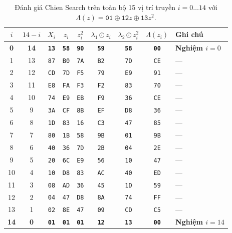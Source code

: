 \begin{table}[!htb]
\centering
\caption{Đánh giá Chien Search trên toàn bộ 15 vị trí truyền $i = 0 \dots 14$ với $\Lambda(z) = \texttt{01} \oplus \texttt{12}z \oplus \texttt{13}z^2$.}
\label{tab:worked_chien}
\scriptsize
\renewcommand{\arraystretch}{1.05}
\begin{tabular}{@{} c c c c c c c c l @{}}
\toprule
$i$ & $14-i$ & $X_i$ & $z_i$ & $z_i^2$ & $\lambda_1 \odot z_i$ & $\lambda_2 \odot z_i^2$ & $\Lambda(z_i)$ & Ghi chú \\
\midrule
\textbf{0} & \textbf{14} & \textbf{\texttt{13}} & \textbf{\texttt{58}} & \textbf{\texttt{90}} & \textbf{\texttt{59}} & \textbf{\texttt{58}} & \textbf{\texttt{00}} & \textbf{Nghiệm $i=0$} \\
1 & 13 & \texttt{87} & \texttt{B0} & \texttt{7A} & \texttt{B2} & \texttt{7D} & \texttt{CE} & --- \\
2 & 12 & \texttt{CD} & \texttt{7D} & \texttt{F5} & \texttt{79} & \texttt{E9} & \texttt{91} & --- \\
3 & 11 & \texttt{E8} & \texttt{FA} & \texttt{F3} & \texttt{F2} & \texttt{83} & \texttt{70} & --- \\
4 & 10 & \texttt{74} & \texttt{E9} & \texttt{EB} & \texttt{F9} & \texttt{36} & \texttt{CE} & --- \\
5 & 9  & \texttt{3A} & \texttt{CF} & \texttt{8B} & \texttt{EF} & \texttt{D8} & \texttt{36} & --- \\
6 & 8  & \texttt{1D} & \texttt{83} & \texttt{16} & \texttt{C3} & \texttt{47} & \texttt{85} & --- \\
7 & 7  & \texttt{80} & \texttt{1B} & \texttt{58} & \texttt{9B} & \texttt{01} & \texttt{9B} & --- \\
8 & 6  & \texttt{40} & \texttt{36} & \texttt{7D} & \texttt{2B} & \texttt{04} & \texttt{2E} & --- \\
9 & 5  & \texttt{20} & \texttt{6C} & \texttt{E9} & \texttt{56} & \texttt{10} & \texttt{47} & --- \\
10 & 4 & \texttt{10} & \texttt{D8} & \texttt{83} & \texttt{AC} & \texttt{40} & \texttt{ED} & --- \\
11 & 3 & \texttt{08} & \texttt{AD} & \texttt{36} & \texttt{45} & \texttt{1D} & \texttt{59} & --- \\
12 & 2 & \texttt{04} & \texttt{47} & \texttt{D8} & \texttt{8A} & \texttt{74} & \texttt{FF} & --- \\
13 & 1 & \texttt{02} & \texttt{8E} & \texttt{47} & \texttt{09} & \texttt{CD} & \texttt{C5} & --- \\
\textbf{14} & \textbf{0} & \textbf{\texttt{01}} & \textbf{\texttt{01}} & \textbf{\texttt{01}} & \textbf{\texttt{12}} & \textbf{\texttt{13}} & \textbf{\texttt{00}} & \textbf{Nghiệm $i=14$} \\
\bottomrule
\end{tabular}
\end{table}


